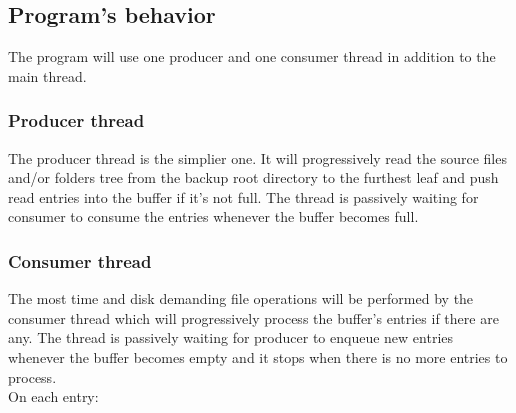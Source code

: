 \documentclass[a4paper]{article}
\begin{document}
    \subsection{Program's behavior} 
      The program will use one producer and one consumer thread in addition to the main thread.
      \subsubsection{Producer thread}
        The producer thread is the simplier one. It will progressively read the source files and/or folders tree from the backup root directory to the furthest leaf and push read entries into the buffer if it's not full. The thread is passively waiting for consumer to consume the entries whenever the buffer becomes full.
      \subsubsection{Consumer thread}
        The most time and disk demanding file operations will be performed by the consumer thread which will progressively process the buffer's entries if there are any. The thread is passively waiting for producer to enqueue new entries whenever the buffer becomes empty and it stops when there is no more entries to process. \\
        \indent On each entry:
\end{document}
